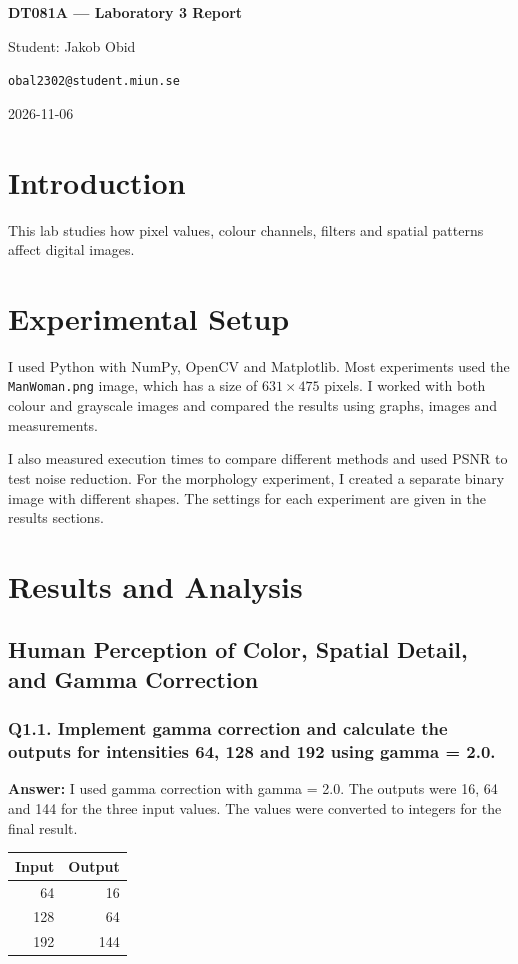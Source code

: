 \documentclass[11pt,a4paper]{article}
\begin{document}
\begin{center}
{\Large\bfseries DT081A --- Laboratory 3 Report\par}
Student: Jakob Obid\par
\texttt{obal2302@student.miun.se}\par
2026-11-06
\end{center}

\section{Introduction}
This lab studies how pixel values, colour channels, filters and spatial patterns affect digital images.

\section{Experimental Setup}
I used Python with NumPy, OpenCV and Matplotlib. Most experiments used the \texttt{ManWoman.png} image, which has a size of \(631 \times 475\) pixels. I worked with both colour and grayscale images and compared the results using graphs, images and measurements.

I also measured execution times to compare different methods and used PSNR to test noise reduction. For the morphology experiment, I created a separate binary image with different shapes. The settings for each experiment are given in the results sections.

\section{Results and Analysis}
\subsection{Human Perception of Color, Spatial Detail, and Gamma Correction}

\subsubsection*{Q1.1. Implement gamma correction and calculate the outputs for intensities 64, 128 and 192 using gamma = 2.0.}
\textbf{Answer:} I used gamma correction with gamma = 2.0. The outputs were 16, 64 and 144 for the three input values. The values were converted to integers for the final result.

\begin{table}[H]
\centering
\begin{tabular}{rr}
\hline
Input & Output \\
\hline
64 & 16 \\
128 & 64 \\
192 & 144 \\
\hline
\end{tabular}
\end{table}
\end{document}
